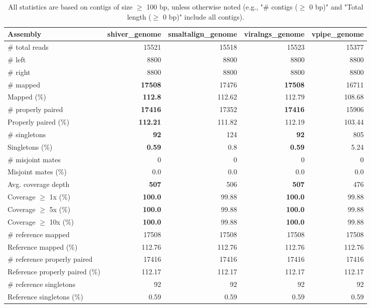 \documentclass[12pt,a4paper]{article}
\begin{document}
\begin{table}[ht]
\begin{center}
\caption{All statistics are based on contigs of size $\geq$ 100 bp, unless otherwise noted (e.g., "\# contigs ($\geq$ 0 bp)" and "Total length ($\geq$ 0 bp)" include all contigs).}
\begin{tabular}{|l*{4}{|r}|}
\hline
Assembly & shiver\_genome & smaltalign\_genome & viralngs\_genome & vpipe\_genome \\ \hline
\# total reads & 15521 & 15518 & 15523 & 15377 \\ \hline
\# left & 8800 & 8800 & 8800 & 8800 \\ \hline
\# right & 8800 & 8800 & 8800 & 8800 \\ \hline
\# mapped & {\bf 17508} & 17476 & {\bf 17508} & 16711 \\ \hline
Mapped (\%) & {\bf 112.8} & 112.62 & 112.79 & 108.68 \\ \hline
\# properly paired & {\bf 17416} & 17352 & {\bf 17416} & 15906 \\ \hline
Properly paired (\%) & {\bf 112.21} & 111.82 & 112.19 & 103.44 \\ \hline
\# singletons & {\bf 92} & 124 & {\bf 92} & 805 \\ \hline
Singletons (\%) & {\bf 0.59} & 0.8 & {\bf 0.59} & 5.24 \\ \hline
\# misjoint mates & 0 & 0 & 0 & 0 \\ \hline
Misjoint mates (\%) & 0.0 & 0.0 & 0.0 & 0.0 \\ \hline
Avg. coverage depth & {\bf 507} & 506 & {\bf 507} & 476 \\ \hline
Coverage $\geq$ 1x (\%) & {\bf 100.0} & 99.88 & {\bf 100.0} & 99.88 \\ \hline
Coverage $\geq$ 5x (\%) & {\bf 100.0} & 99.88 & {\bf 100.0} & 99.88 \\ \hline
Coverage $\geq$ 10x (\%) & {\bf 100.0} & 99.88 & {\bf 100.0} & 99.88 \\ \hline
\# reference mapped & 17508 & 17508 & 17508 & 17508 \\ \hline
Reference mapped (\%) & 112.76 & 112.76 & 112.76 & 112.76 \\ \hline
\# reference properly paired & 17416 & 17416 & 17416 & 17416 \\ \hline
Reference properly paired (\%) & 112.17 & 112.17 & 112.17 & 112.17 \\ \hline
\# reference singletons & 92 & 92 & 92 & 92 \\ \hline
Reference singletons (\%) & 0.59 & 0.59 & 0.59 & 0.59 \\ \hline

\end{tabular}
\end{center}
\end{table}
\end{document}
